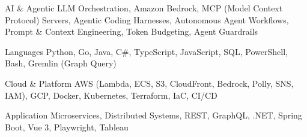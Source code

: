 
\begin{cvskills}

  \cvskill
    {AI \& Agentic}
    {LLM Orchestration, Amazon Bedrock, MCP (Model Context Protocol) Servers, Agentic Coding Harnesses, Autonomous Agent Workflows, Prompt \& Context Engineering, Token Budgeting, Agent Guardrails}

  \cvskill
    {Languages}
    {Python, Go, Java, C\#, TypeScript, JavaScript, SQL, PowerShell, Bash, Gremlin (Graph Query)}

  \cvskill
    {Cloud \& Platform}
    {AWS (Lambda, ECS, S3, CloudFront, Bedrock, Polly, SNS, IAM), GCP, Docker, Kubernetes, Terraform, IaC, CI/CD}

  \cvskill
    {Application}
    {Microservices, Distributed Systems, REST, GraphQL, .NET, Spring Boot, Vue 3, Playwright, Tableau}

\end{cvskills}
